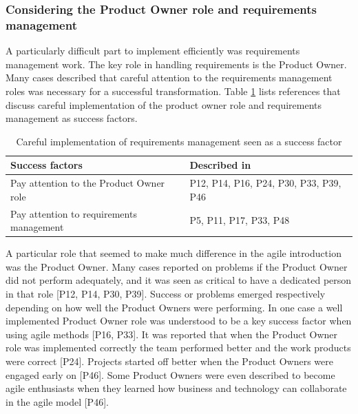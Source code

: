 \subsubsection{Considering the Product Owner role and requirements management}

A particularly difficult part to implement efficiently was requirements
management work. The key role in handling requirements is the Product Owner.
Many cases described that careful attention to the requirements management roles
was necessary for a successful transformation.
Table \ref{table:success_requirements} lists references that discuss careful
implementation of the product owner role and requirements management as success
factors.

\begin{table}[h]
    \centering
    \begin{tabular}{ >{\raggedright\arraybackslash}p{}
                     >{\raggedright\arraybackslash}p{} }
        \toprule
        Success factors  &  Described in \\
        \midrule
        Pay attention to the Product Owner role  &
                P12, P14, P16, P24, P30, P33, P39, P46  \\
        Pay attention to requirements management  &
                P5, P11, P17, P33, P48  \\
        \bottomrule
    \end{tabular}
    \caption{Careful implementation of requirements management seen as a
             success factor}
    \label{table:success_requirements}
\end{table}


A particular role that seemed to make much difference in the agile introduction
was the Product Owner. Many cases reported on problems if the Product Owner did
not perform adequately, and it was seen as critical to have a dedicated person
in that role [P12, P14, P30, P39].
Success or problems emerged respectively depending on how well the Product
Owners were performing. In one case a well implemented Product Owner role was
understood to be a key success factor when using agile methods [P16, P33].
It was reported that when the Product Owner role was implemented correctly the
team performed better and the work products were correct [P24]. Projects started
off better when the Product Owners were engaged early on [P46]. Some Product
Owners were even described to become agile enthusiasts when they learned how
business and technology can collaborate in the agile model [P46].

